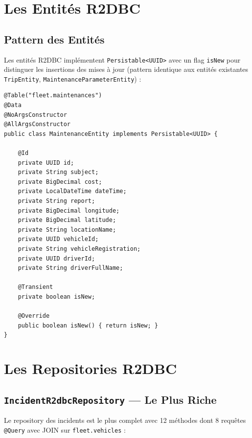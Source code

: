 \documentclass[12pt,a4paper]{report}
\begin{document}
\section{Les Entités R2DBC}

\subsection{Pattern des Entités}

Les entités R2DBC implémentent \texttt{Persistable<UUID>} avec un flag \texttt{isNew} pour distinguer les insertions des mises à jour (pattern identique aux entités existantes \texttt{TripEntity}, \texttt{MaintenanceParameterEntity}) :

\begin{lstlisting}[style=javaStyle, caption={Pattern d'entité R2DBC avec Persistable}]
@Table("fleet.maintenances")
@Data
@NoArgsConstructor
@AllArgsConstructor
public class MaintenanceEntity implements Persistable<UUID> {

    @Id
    private UUID id;
    private String subject;
    private BigDecimal cost;
    private LocalDateTime dateTime;
    private String report;
    private BigDecimal longitude;
    private BigDecimal latitude;
    private String locationName;
    private UUID vehicleId;
    private String vehicleRegistration;
    private UUID driverId;
    private String driverFullName;

    @Transient
    private boolean isNew;

    @Override
    public boolean isNew() { return isNew; }
}
\end{lstlisting}

\section{Les Repositories R2DBC}

\subsection{\texttt{IncidentR2dbcRepository} — Le Plus Riche}

Le repository des incidents est le plus complet avec 12 méthodes dont 8 requêtes \texttt{@Query} avec JOIN sur \texttt{fleet.vehicles} :
\end{document}

